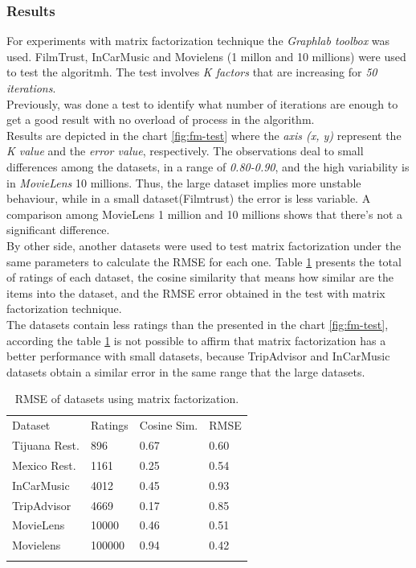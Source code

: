 \subsubsection{Results} 

For experiments with matrix factorization technique the \textit{Graphlab
toolbox} was used. FilmTrust, InCarMusic and Movielens (1 millon and
10 millions) were used to test the algoritmh. The test involves \textit{K
factors} that are increasing for \textit{50 iterations}.\\ Previously, was 
done a test to identify what number of iterations are enough to get a good
result with no overload of process in the algorithm. \\ Results are
depicted in the chart \ref{fig:fm-test} where the \textit{axis (x, y)}
represent the \textit{K value} and the \textit{error value}, respectively. 
The observations deal to small differences among the datasets, in a range
of \textit{0.80-0.90}, and the high variability is in \textit{MovieLens} 10
millions. Thus, the large dataset implies more unstable 
behaviour, while in a small dataset(Filmtrust) the error is less variable.
A comparison among MovieLens 1 million and 10 millions shows that 
there's not a significant difference.\\  
By other side, another datasets were used to test matrix factorization
under the same parameters to calculate the RMSE for each one.  Table
\ref{tab:mf-set} presents the total of ratings of each dataset, the
cosine similarity that means how similar are the items into the
dataset, and the RMSE error obtained in the test with matrix
factorization technique. \\The datasets contain less ratings than
the presented in the chart \ref{fig:fm-test}, according the table
\ref{tab:mf-set} is not possible to affirm that matrix factorization
has a better performance with small datasets, because TripAdvisor and
InCarMusic datasets obtain a similar error in the same range that the large
datasets.
\begin{table}
\centering
\small
\captionsetup{font=footnotesize}
\caption{RMSE of datasets using matrix factorization.}
\label{tab:mf-set}   
\begin{tabular}{llll}
\hline\noalign{\smallskip}
Dataset & Ratings & Cosine Sim. & RMSE \\
\noalign{\smallskip}\hline\noalign{\smallskip}
Tijuana Rest.  &    896       &  0.67    &   0.60 \\
Mexico Rest.  &   1161       &  0.25    &  0.54 \\
InCarMusic    &    4012      &  0.45     &  0.93 \\
TripAdvisor    &    4669      &  0.17     &  0.85 \\
MovieLens    &    10000     &   0.46    &  0.51 \\
Movielens    &     100000   &   0.94    &  0.42 \\
\noalign{\smallskip}\hline
\end{tabular}
\end{table}

